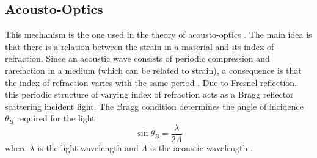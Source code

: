 \documentclass[10pt,a4paper]{eitExjobb}
\begin{document}
	\subsection{Acousto-Optics}
	This mechanism is the one used in the theory of acousto-optics \cite{Saleh2007}\cite{Korpel1981}. The main idea is that there is a relation between the strain in a material and its index of refraction. Since an acoustic wave consists of periodic compression and rarefaction in a medium (which can be related to strain), a consequence is that the index of refraction varies with the same period \cite{Saleh2007}. Due to Fresnel reflection, this periodic structure of varying index of refraction acts as a Bragg reflector scattering incident light. The Bragg condition determines the angle of incidence $\theta_B$ required for the light
	\begin{equation*}
	\sin{\theta_B} = \frac{\lambda}{2\Lambda}
	\end{equation*}
	where $\lambda$ is the light wavelength and $\Lambda$ is the acoustic wavelength \cite{Saleh2007}.
	
\end{document}
